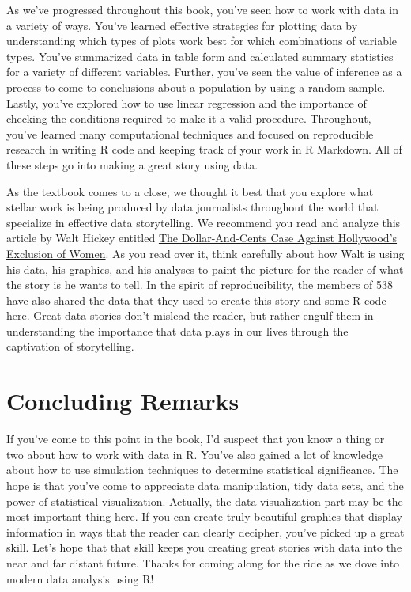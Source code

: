\documentclass[]{tufte-book}
\begin{document}
As we've progressed throughout this book, you've seen how to work with
data in a variety of ways. You've learned effective strategies for
plotting data by understanding which types of plots work best for which
combinations of variable types. You've summarized data in table form and
calculated summary statistics for a variety of different variables.
Further, you've seen the value of inference as a process to come to
conclusions about a population by using a random sample. Lastly, you've
explored how to use linear regression and the importance of checking the
conditions required to make it a valid procedure. Throughout, you've
learned many computational techniques and focused on reproducible
research in writing R code and keeping track of your work in R Markdown.
All of these steps go into making a great story using data.

As the textbook comes to a close, we thought it best that you explore
what stellar work is being produced by data journalists throughout the
world that specialize in effective data storytelling. We recommend you
read and analyze this article by Walt Hickey entitled
\href{http://fivethirtyeight.com/features/the-dollar-and-cents-case-against-hollywoods-exclusion-of-women/}{The
Dollar-And-Cents Case Against Hollywood's Exclusion of Women}. As you
read over it, think carefully about how Walt is using his data, his
graphics, and his analyses to paint the picture for the reader of what
the story is he wants to tell. In the spirit of reproducibility, the
members of 538 have also shared the data that they used to create this
story and some R code
\href{https://github.com/fivethirtyeight/data/tree/master/bechdel}{here}.
Great data stories don't mislead the reader, but rather engulf them in
understanding the importance that data plays in our lives through the
captivation of storytelling.

\section*{Concluding Remarks}\label{concluding-remarks}

If you've come to this point in the book, I'd suspect that you know a
thing or two about how to work with data in R. You've also gained a lot
of knowledge about how to use simulation techniques to determine
statistical significance. The hope is that you've come to appreciate
data manipulation, tidy data sets, and the power of statistical
visualization. Actually, the data visualization part may be the most
important thing here. If you can create truly beautiful graphics that
display information in ways that the reader can clearly decipher, you've
picked up a great skill. Let's hope that that skill keeps you creating
great stories with data into the near and far distant future. Thanks for
coming along for the ride as we dove into modern data analysis using R!
\end{document}
